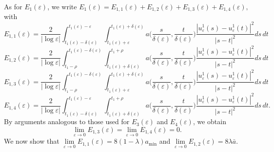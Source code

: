 \documentclass[12pt]{article}
\numberwithin{equation}{section}
\begin{document}
As for $E_1(\varepsilon)$, we write
$
  E_{1}(\varepsilon)=E_{1,1}(\varepsilon)+E_{1,2}(\varepsilon)+E_{1,3}(\varepsilon)+E_{1,4}(\varepsilon),  
$
 with
 \begin{equation*}
  E_{1,1}(\varepsilon)= \frac{2}{|\log\varepsilon|}\int_{t_{1}(\varepsilon)-\delta(\varepsilon)}^{t_{1}(\varepsilon)-\varepsilon}\int_{t_{1}(\varepsilon)+\varepsilon}^{t_{1}(\varepsilon)+\delta(\varepsilon)}a\Big(\frac{s}{\delta(\varepsilon)},\frac{t}{\delta(\varepsilon)}\Big)\frac{\left|u^{1}_{\varepsilon}(s)-u^{1}_{\varepsilon}(t)\right|^2}{\left|s-t\right|^2}ds\,dt  
 \end{equation*}\begin{equation*}
  E_{1,2}(\varepsilon)= \frac{2}{|\log\varepsilon|}\int_{t_{1}-\rho}^{t_{1}(\varepsilon)-\delta(\varepsilon)}\int_{t_{1}(\varepsilon)+\delta(\varepsilon)}^{t_{1}+\rho}a\Big(\frac{s}{\delta(\varepsilon)},\frac{t}{\delta(\varepsilon)}\Big)\frac{\left|u^{1}_{\varepsilon}(s)-u^{1}_{\varepsilon}(t)\right|^2}{\left|s-t\right|^2}ds\,dt   
 \end{equation*}
 \begin{equation*}
  E_{1,3}(\varepsilon)=\frac{2}{|\log\varepsilon|}\int_{t_{1}-\rho}^{t_{1}(\varepsilon)-\delta(\varepsilon)}\int_{t_{1}(\varepsilon)+\varepsilon}^{t_{1}(\varepsilon)+\delta(\varepsilon)}a\Big(\frac{s}{\delta(\varepsilon)},\frac{t}{\delta(\varepsilon)}\Big)\frac{\left|u^{1}_{\varepsilon}(s)-u^{1}_{\varepsilon}(t)\right|^2}{\left|s-t\right|^2}ds\,dt   
 \end{equation*}
 \begin{equation*}
  E_{1,4}(\varepsilon)=\frac{2}{|\log\varepsilon|}\int_{t_{1}(\varepsilon)-\delta(\varepsilon)}^{t_{1}(\varepsilon)-\varepsilon}\int_{t_{1}(\varepsilon)+\delta(\varepsilon)}^{t_{1}+\rho}a\Big(\frac{s}{\delta(\varepsilon)},\frac{t}{\delta(\varepsilon)}\Big)\frac{\left|u^{1}_{\varepsilon}(s)-u^{1}_{\varepsilon}(t)\right|^2}{\left|s-t\right|^2}ds\,dt.   
 \end{equation*}
 By arguments analogous to those used for $E_3(\varepsilon)$ and $E_4(\varepsilon)$, we obtain
 \[
 \lim_{\varepsilon\to0}E_{1,3}(\varepsilon)=\lim_{\varepsilon\to0}E_{1,4}(\varepsilon)=0.
 \] 
 We now show that 
 $\lim\limits_{\varepsilon\to0}E_{1,1}(\varepsilon)=8(1-\lambda) a_{\min}$ and $\lim\limits_{\varepsilon\to0}E_{1,2}(\varepsilon)=8\lambda\bar{a}$.
 
\end{document}
